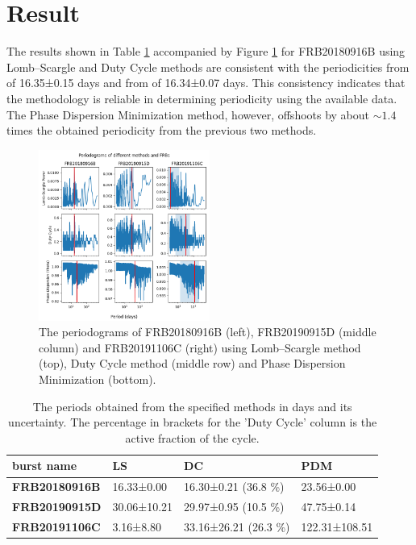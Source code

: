 \documentclass[reprint,amsmath,amssymb,showkeys,prd]{revtex4-2}
\begin{document}
\section{Result}

The results shown in Table \ref{tbl-result} accompanied by Figure \ref{fig-periodogram} for FRB20180916B using Lomb--Scargle and Duty Cycle methods are consistent with the periodicities from \citet{thechimefrbcollaborationPeriodicActivityFast2020} of 16.35±0.15 days and from \citet{sand_CHIMEFRBStudy_2023} of 16.34±0.07 days.
This consistency indicates that the methodology is reliable in determining periodicity using the available data.
The Phase Dispersion Minimization method, however, offshoots by about $\sim 1.4$ times the obtained periodicity from the previous two methods.

\begin{figure}[ht]
    \label{fig-periodogram}
    \caption{
    The periodograms of FRB20180916B (left), FRB20190915D (middle column) and FRB20191106C (right) using Lomb--Scargle method (top), Duty Cycle method (middle row) and Phase Dispersion Minimization (bottom).
    }
    \centering
    \includegraphics[width=0.5\textwidth]{periodograms.png}
\end{figure}

\begin{table}[!ht]
    \centering
    \caption{The periods obtained from the specified methods in days and its uncertainty. The percentage in brackets for the 'Duty Cycle' column is the active fraction of the cycle.}
    \begin{tabular}{l p{0.7in} p{0.7in} p{0.7in}}
    
    \hline
        \textbf{burst name} & \textbf{LS} & \textbf{DC} & \textbf{PDM} \\ \hline
        \textbf{FRB20180916B} & 16.33±0.00 & 16.30±0.21 (36.8 \%) & 23.56±0.00 \\ 
        \textbf{FRB20190915D} & 30.06±10.21 & 29.97±0.95 (10.5 \%) & 47.75±0.14 \\ 
        \textbf{FRB20191106C} & 3.16±8.80 & 33.16±26.21 (26.3 \%) & 122.31±108.51 \\ \hline
    \end{tabular}
    \label{tbl-result}
\end{table}
\end{document}
